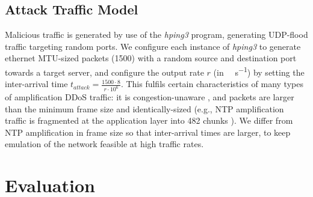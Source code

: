 \documentclass[10pt, times, comsoc]{IEEEtran}
\begin{document}
\subsection{Attack Traffic Model}\label{sec:attack-traffic-model}
\cbstart
{\color{revisiontext}Malicious traffic is generated by use of the \emph{hping3} program, generating UDP-flood traffic targeting random ports.
We configure each instance of \emph{hping3} to generate ethernet MTU-sized packets (\SI{1500}{\byte}) with a random source and destination port towards a target server, and configure the output rate $r$ (in \si{\mega\bit\per\second}) by setting the inter-arrival time $t_{\mathit{attack}}=\frac{1500 \cdot 8}{r\cdot10^6}$.
This fulfils certain characteristics of many types of amplification DDoS traffic: it is congestion-unaware \cite{DBLP:conf/ndss/Rossow14}, and packets are larger than the minimum frame size and identically-sized (e.g., NTP amplification traffic is fragmented at the application layer into \SI{482}{\byte} chunks \cite{cisco-ntp-amp}).
We differ from NTP amplification in frame size so that inter-arrival times are larger, to keep emulation of the network feasible at high traffic rates.}
\cbend

\section{Evaluation}\label{sec:evaluation}

\end{document}
